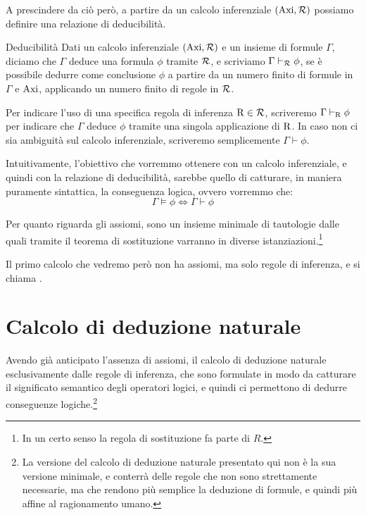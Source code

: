 A prescindere da ciò però, a partire da un calcolo inferenziale \((\operatorname{Axi}, \mathcal{R})\) possiamo definire una relazione di deducibilità.

\begin{definition}[namedlabel={def:deducibility}{Deducibilità}]{Deducibilità}
  Dati un calcolo inferenziale \((\operatorname{Axi}, \mathcal{R})\) e un insieme di formule \(\Gamma\), diciamo che \(\Gamma\) deduce una formula \(\phi\) tramite \(\mathcal{R}\), e scriviamo \(\Gamma \vdash_{\mathcal{R}} \phi\), se è possibile dedurre come conclusione \(\phi\) a partire da un numero finito di formule in \(\Gamma\) e \(\operatorname{Axi}\), applicando un numero finito di regole in \(\mathcal{R}\).

  Per indicare l'uso di una specifica regola di inferenza \(\operatorname{R} \in \mathcal{R}\), scriveremo \(\Gamma \vdash_{\operatorname{R}} \phi\) per indicare che \(\Gamma\) deduce \(\phi\) tramite una singola applicazione di \(\operatorname{R}\).
  In caso non ci sia ambiguità sul calcolo inferenziale, scriveremo semplicemente \(\Gamma \vdash \phi\).
\end{definition}

Intuitivamente, l'obiettivo che vorremmo ottenere con un calcolo inferenziale, e quindi con la relazione di deducibilità, sarebbe quello di catturare, in maniera puramente sintattica, la conseguenza logica, ovvero vorremmo che:
\[\Gamma \models \phi \iff \Gamma \vdash \phi\]

Per quanto riguarda gli assiomi, sono un insieme minimale di tautologie dalle quali tramite il teorema di sostituzione varranno in diverse istanziazioni.\footnote{In un certo senso la regola di sostituzione fa parte di \(R\).}

Il primo calcolo che vedremo però non ha assiomi, ma solo regole di inferenza, e si chiama .

\section{Calcolo di deduzione naturale}

Avendo già anticipato l'assenza di assiomi, il calcolo di deduzione naturale esclusivamente dalle regole di inferenza, che sono formulate in modo da catturare il significato semantico degli operatori logici, e quindi ci permettono di dedurre conseguenze logiche.\footnote{
  La versione del calcolo di deduzione naturale presentato qui non è la sua versione minimale, e conterrà delle regole che non sono strettamente necessarie, ma che rendono più semplice la deduzione di formule, e quindi più affine al ragionamento umano.}

